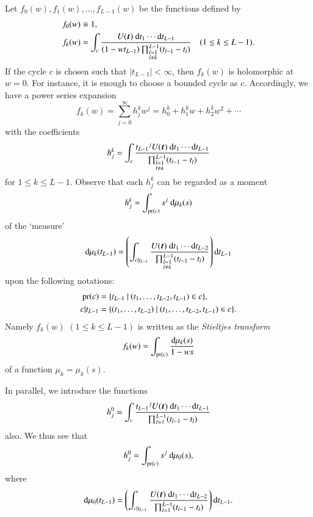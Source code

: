 \documentclass[12pt]{article}
\numberwithin{equation}{section}
\begin{document}
Let 
$f_0(w), f_1(w), \ldots, f_{L-1}(w)$
be the functions defined by
\begin{align*}
f_0(w)&\equiv1,
\\
f_k(w)
&=
\int_{c}
 \frac{U({\boldsymbol t}) \ 
 {\rm d}t_1 \cdots {\rm d}t_{L-1} }{ 
 (1-w t_{L-1})
 \prod_{
 \begin{subarray}{l} 
 l=1 \\  l \neq k 
 \end{subarray}  
 }^{L-1}(t_{l-1}-t_l)
 }
  \quad (1 \leq k \leq L-1).
\end{align*}
If the cycle $c$ is chosen 
such that $|t_{L-1}|< \infty$,
then $f_k(w)$ 
is holomorphic at $w=0$.
For instance, it is 
enough to choose a bounded cycle as $c$. 
Accordingly, we have
a power series expansion
\[
f_k(w)= \sum_{j=0}^\infty h^k_j w^j
=h^k_0+h^k_1 w+h^k_2 w^2+\cdots
\]
with the coefficients
\begin{equation}
\label{eq:hjk}
h^k_j =
\int_{c}
 \frac{  {t_{L-1}}^{j} U({\boldsymbol t}) \ 
 {\rm d}t_1 \cdots {\rm d}t_{L-1} }{ 
 \prod_{
 \begin{subarray}{l} 
 l=1 \\  l \neq k 
 \end{subarray}  
 }^{L-1}(t_{l-1}-t_l)}
\end{equation}
for $1 \leq k \leq L-1$.
Observe that 
each $h^k_j $ can be 
regarded as a moment
\[
h^k_j =
\int_{ {\rm pr} (c) }
 {s}^{j} \ 
  {\rm d} \mu_k(s)
\]
of the `measure'
\[
 {\rm d} \mu_k(t_{L-1})
 =  
 \left(
 \int_{ c |t_{L-1} }
\frac{U({\boldsymbol t}) \ 
{\rm d}t_1 \cdots {\rm d}t_{L-2}}{
 \prod_{
 \begin{subarray}{l} 
 l=1 \\  l \neq k 
 \end{subarray}  
 }^{L-1}(t_{l-1}-t_l)  }
 \right)
{\rm d}t_{L-1}
\]
upon
 the following notations:
\begin{align*}
{\rm pr} (c)
&= \{ t_{L-1} \ | \ (t_1, \ldots, t_{L-2}, t_{L-1}) \in c
\},
\\
c |t_{L-1}
&= \{ 
(t_1, \ldots, t_{L-2})
 \ | \ (t_1, \ldots, t_{L-2}, t_{L-1}) \in c
\}.
\end{align*}
Namely
 $f_k(w)$  $(1 \leq k \leq L-1)$
 is  written as
the {\it Stieltjes transform}
\[
f_k(w)= 
\int_{{\rm pr} (c)}
 \frac{ {\rm d} \mu_k(s) }{ 
 1-w s}
\]
of a function $\mu_k=\mu_k(s)$.



In parallel, we introduce the functions
\begin{equation}
\label{eq:hj}
h_j^0 =
\int_{c}
 \frac{  {t_{L-1}}^{j} U({\boldsymbol t}) \ 
 {\rm d}t_1 \cdots {\rm d}t_{L-1} }{ 
 \prod_{ l=1 }^{L-1}(t_{l-1}-t_l)}
\end{equation}
also.
We thus see that
\[
h_j^0 =
\int_{ {\rm pr} (c) }
 {s}^{j} \ 
  {\rm d} \mu_0(s),
\]
where
\[
 {\rm d} \mu_0(t_{L-1})
 =  
 \left(
 \int_{ c |t_{L-1} }
\frac{U({\boldsymbol t}) \ 
{\rm d}t_1 \cdots {\rm d}t_{L-2}}{
 \prod_{ l=1 }^{L-1}(t_{l-1}-t_l)  }
 \right)
{\rm d}t_{L-1}.
\]
\end{document}
